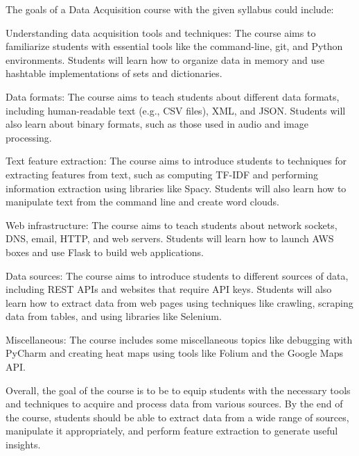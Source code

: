 \documentclass[11pt]{article}
\newenvironment{itemize*}%
  {\begin{itemize}%
    \setlength{\itemsep}{0pt}%
    \setlength{\parskip}{0pt}}%
  {\end{itemize}}
\begin{document}
The goals of a Data Acquisition course with the given syllabus could include:
\begin{itemize*}
\item Understanding data acquisition tools and techniques: The course aims to familiarize students with essential tools like the command-line, git, and Python environments. Students will learn how to organize data in memory and use hashtable implementations of sets and dictionaries.

\item Data formats: The course aims to teach students about different data formats, including human-readable text (e.g., CSV files), XML, and JSON. Students will also learn about binary formats, such as those used in audio and image processing.

\item Text feature extraction: The course aims to introduce students to techniques for extracting features from text, such as computing TF-IDF and performing information extraction using libraries like Spacy. Students will also learn how to manipulate text from the command line and create word clouds.

\item Web infrastructure: The course aims to teach students about network sockets, DNS, email, HTTP, and web servers. Students will learn how to launch AWS boxes and use Flask to build web applications.

\item Data sources: The course aims to introduce students to different sources of data, including REST APIs and websites that require API keys. Students will also learn how to extract data from web pages using techniques like crawling, scraping data from tables, and using libraries like Selenium.

\item Miscellaneous: The course includes some miscellaneous topics like debugging with PyCharm and creating heat maps using tools like Folium and the Google Maps API.
\end{itemize*}

Overall, the goal of the course is to be to equip students with the necessary tools and techniques to acquire and process data from various sources. By the end of the course, students should be able to extract data from a wide range of sources, manipulate it appropriately, and perform feature extraction to generate useful insights.

\vspace{0.5in}
\end{document}
